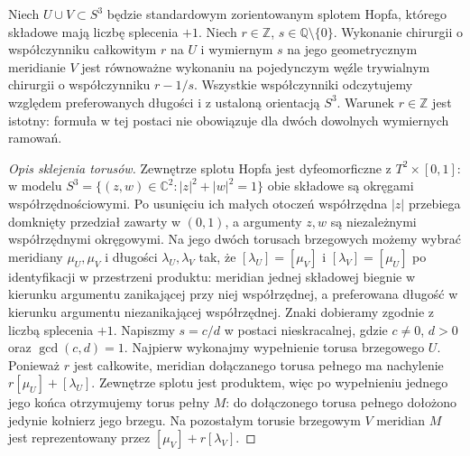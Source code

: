 \begin{lemat}
\label{lem:tg-kirby-slam-dunk}
Niech $U\cup V\subset S^3$ będzie standardowym zorientowanym
splotem Hopfa, którego składowe mają liczbę splecenia $+1$.
Niech $r\in\mathbb Z$, $s\in\mathbb Q\setminus\{0\}$.
Wykonanie chirurgii o współczynniku całkowitym $r$ na $U$
i wymiernym $s$ na jego geometrycznym meridianie $V$
jest równoważne wykonaniu na pojedynczym węźle trywialnym
chirurgii o współczynniku $r-1/s$. Wszystkie
współczynniki odczytujemy względem preferowanych
długości i z ustaloną orientacją $S^3$.
Warunek $r\in\mathbb Z$ jest istotny:
formuła w tej postaci nie obowiązuje dla dwóch
dowolnych wymiernych ramowań.
\end{lemat}
\begin{proof}[Opis sklejenia torusów]
Zewnętrze splotu Hopfa jest dyfeomorficzne
z $T^2\times[0,1]$: w modelu
$S^3=\{(z,w)\in\mathbb C^2:|z|^2+|w|^2=1\}$
obie składowe są okręgami współrzędnościowymi.
Po usunięciu ich małych otoczeń współrzędna
$|z|$ przebiega domknięty przedział zawarty
w $(0,1)$, a argumenty $z,w$ są niezależnymi
współrzędnymi okręgowymi. Na jego dwóch torusach brzegowych
możemy wybrać meridiany $\mu_U,\mu_V$ i długości
$\lambda_U,\lambda_V$ tak, że
$[\lambda_U]=[\mu_V]$ i $[\lambda_V]=[\mu_U]$
po identyfikacji w przestrzeni produktu:
meridian jednej składowej biegnie w kierunku
argumentu zanikającej przy niej współrzędnej,
a preferowana długość w kierunku argumentu
niezanikającej współrzędnej. Znaki dobieramy
zgodnie z liczbą splecenia $+1$.
Napiszmy $s=c/d$ w postaci nieskracalnej,
gdzie $c\ne0$, $d>0$ oraz
$\gcd(c,d)=1$.
Najpierw wykonajmy wypełnienie torusa brzegowego $U$.
Ponieważ $r$ jest całkowite, meridian dołączanego
torusa pełnego ma nachylenie $r[\mu_U]+[\lambda_U]$.
Zewnętrze splotu jest produktem, więc po wypełnieniu
jednego jego końca otrzymujemy torus pełny $M$:
do dołączonego torusa pełnego dołożono jedynie kołnierz
jego brzegu. Na pozostałym torusie brzegowym $V$
meridian $M$ jest reprezentowany przez
$[\mu_V]+r[\lambda_V]$.


\end{proof}
